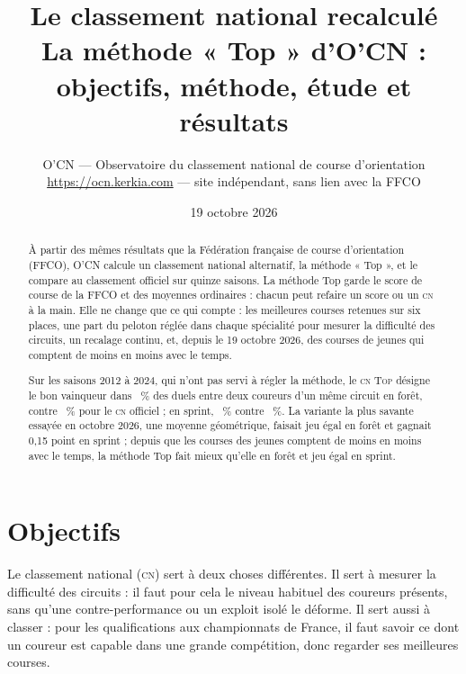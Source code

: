 \documentclass[11pt,a4paper]{article}
\title{Le classement national recalculé\\\large La méthode « Top » d'O'CN : objectifs, méthode, étude et résultats}
\author{O'CN — Observatoire du classement national de course d'orientation\\\small \url{https://ocn.kerkia.com} — site indépendant, sans lien avec la FFCO}
\date{19 octobre 2026}
\newcommand{\Top}{\textsc{Top}}
\newcommand{\CN}{\textsc{cn}}
\begin{document}
\maketitle

\begin{abstract}
À partir des mêmes résultats que la Fédération française de course d'orientation (FFCO), O'CN calcule un classement national alternatif, la méthode « Top », et le compare au classement officiel sur quinze saisons. La méthode Top garde le score de course de la FFCO et des moyennes ordinaires : chacun peut refaire un score ou un \CN{} à la main. Elle ne change que ce qui compte : les meilleures courses retenues sur six places, une part du peloton réglée dans chaque spécialité pour mesurer la difficulté des circuits, un recalage continu, et, depuis le 19 octobre 2026, des courses de jeunes qui comptent de moins en moins avec le temps.

Sur les saisons 2012 à 2024, qui n'ont pas servi à régler la méthode, le \CN{} \Top{} désigne le bon vainqueur dans \NaccFtop~\% des duels entre deux coureurs d'un même circuit en forêt, contre \NaccFoff~\% pour le \CN{} officiel ; en sprint, \NaccStop~\% contre \NaccSoff~\%. La variante la plus savante essayée en octobre 2026, une moyenne géométrique, faisait jeu égal en forêt et gagnait 0,15 point en sprint ; depuis que les courses des jeunes comptent de moins en moins avec le temps, la méthode Top fait mieux qu'elle en forêt et jeu égal en sprint.
\end{abstract}

\tableofcontents

\section{Objectifs}

Le classement national (\CN) sert à deux choses différentes. Il sert à mesurer la difficulté des circuits : il faut pour cela le niveau habituel des coureurs présents, sans qu'une contre-performance ou un exploit isolé le déforme. Il sert aussi à classer : pour les qualifications aux championnats de France, il faut savoir ce dont un coureur est capable dans une grande compétition, donc regarder ses meilleures courses.
\end{document}
